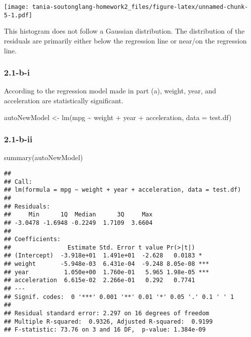 \documentclass[
]{article}
\newenvironment{Shaded}{\begin{snugshade}}{\end{snugshade}}
\newcommand{\AttributeTok}[1]{\textcolor[rgb]{0.77,0.63,0.00}{#1}}
\newcommand{\FunctionTok}[1]{\textcolor[rgb]{0.00,0.00,0.00}{#1}}
\newcommand{\NormalTok}[1]{#1}
\newcommand{\OtherTok}[1]{\textcolor[rgb]{0.56,0.35,0.01}{#1}}
\newcommand{\SpecialCharTok}[1]{\textcolor[rgb]{0.00,0.00,0.00}{#1}}
\begin{document}
\texttt{[image: tania-soutonglang-homework2\_files/figure-latex/unnamed-chunk-5-1.pdf]}

This histogram does not follow a Gaussian distribution. The distribution
of the residuals are primarily either below the regression line or
near/on the regression line.

\hypertarget{b-i}{%
\subsubsection{2.1-b-i}\label{b-i}}

According to the regression model made in part (a), weight, year, and
acceleration are statistically significant.

\begin{Shaded}
\begin{Highlighting}[]
\NormalTok{autoNewModel }\OtherTok{\textless{}{-}} \FunctionTok{lm}\NormalTok{(mpg }\SpecialCharTok{\textasciitilde{}}\NormalTok{ weight }\SpecialCharTok{+}\NormalTok{ year }\SpecialCharTok{+}\NormalTok{ acceleration, }\AttributeTok{data =}\NormalTok{ test.df)}
\end{Highlighting}
\end{Shaded}

\hypertarget{b-ii}{%
\subsubsection{2.1-b-ii}\label{b-ii}}

\begin{Shaded}
\begin{Highlighting}[]
\FunctionTok{summary}\NormalTok{(autoNewModel)}
\end{Highlighting}
\end{Shaded}

\begin{verbatim}
## 
## Call:
## lm(formula = mpg ~ weight + year + acceleration, data = test.df)
## 
## Residuals:
##     Min      1Q  Median      3Q     Max 
## -3.0478 -1.6948 -0.2249  1.7109  3.6604 
## 
## Coefficients:
##                Estimate Std. Error t value Pr(>|t|)    
## (Intercept)  -3.918e+01  1.491e+01  -2.628   0.0183 *  
## weight       -5.948e-03  6.431e-04  -9.248 8.05e-08 ***
## year          1.050e+00  1.760e-01   5.965 1.98e-05 ***
## acceleration  6.615e-02  2.266e-01   0.292   0.7741    
## ---
## Signif. codes:  0 '***' 0.001 '**' 0.01 '*' 0.05 '.' 0.1 ' ' 1
## 
## Residual standard error: 2.297 on 16 degrees of freedom
## Multiple R-squared:  0.9326, Adjusted R-squared:  0.9199 
## F-statistic: 73.76 on 3 and 16 DF,  p-value: 1.384e-09
\end{verbatim}
\end{document}

